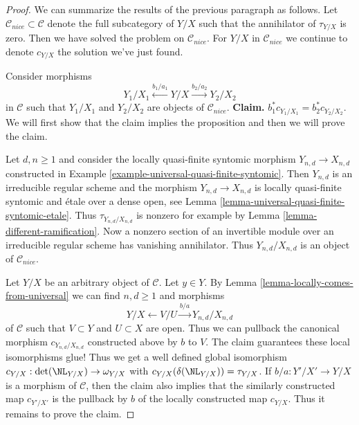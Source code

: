 \begin{proof}
\medskip\noindent
We can summarize the results of the previous paragraph as follows.
Let $\mathcal{C}_{nice} \subset \mathcal{C}$ denote the
full subcategory of $Y/X$ such that the annihilator of
$\tau_{Y/X}$ is zero. Then we have solved the problem
on $\mathcal{C}_{nice}$. For $Y/X$ in $\mathcal{C}_{nice}$
we continue to denote $c_{Y/X}$ the solution we've just found.

\medskip\noindent
Consider morphisms
$$
Y_1/X_1 \xleftarrow{b_1/a_1} Y/X \xrightarrow{b_2/a_2} Y_2/X_2
$$
in $\mathcal{C}$ such that $Y_1/X_1$ and $Y_2/X_2$ are objects
of $\mathcal{C}_{nice}$. {\bf Claim.} $b_1^*c_{Y_1/X_1} = b_2^*c_{Y_2/X_2}$.
We will first show that the claim implies the proposition
and then we will prove the claim.

\medskip\noindent
Let $d, n \geq 1$ and consider the locally
quasi-finite syntomic morphism $Y_{n, d} \to X_{n, d}$
constructed in Example \ref{example-universal-quasi-finite-syntomic}.
Then $Y_{n, d}$ is an irreducible regular scheme and the
morphism $Y_{n, d} \to X_{n, d}$ is locally quasi-finite syntomic
and \'etale over a dense open, see
Lemma \ref{lemma-universal-quasi-finite-syntomic-etale}.
Thus $\tau_{Y_{n, d}/X_{n, d}}$ is nonzero for example by
Lemma \ref{lemma-different-ramification}. Now a nonzero section
of an invertible module over an irreducible regular scheme
has vanishing annihilator. Thus
$Y_{n, d}/X_{n, d}$ is an object of $\mathcal{C}_{nice}$.

\medskip\noindent
Let $Y/X$ be an arbitrary object of $\mathcal{C}$. Let $y \in Y$.
By Lemma \ref{lemma-locally-comes-from-universal} we can find
$n, d \geq 1$ and morphisms
$$
Y/X \leftarrow V/U \xrightarrow{b/a} Y_{n, d}/X_{n, d}
$$
of $\mathcal{C}$ such that $V \subset Y$ and $U \subset X$ are open.
Thus we can pullback the canonical morphism $c_{Y_{n, d}/X_{n, d}}$
constructed above by $b$ to $V$. The claim guarantees these local
isomorphisms glue! Thus we get a well defined global isomorphism
$c_{Y/X} : \det(\NL_{Y/X}) \to \omega_{Y/X}$ with
$c_{Y/X}(\delta(\NL_{Y/X})) = \tau_{Y/X}$.
If $b/a : Y'/X' \to Y/X$ is a morphism of $\mathcal{C}$, then
the claim also implies that the similarly constructed map
$c_{Y'/X'}$ is the pullback by $b$ of the locally constructed
map $c_{Y/X}$. Thus it remains to prove the claim.


\end{proof}
